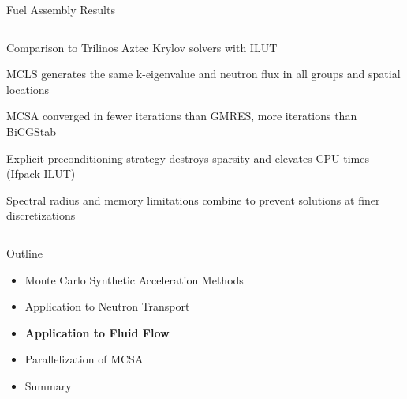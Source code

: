 \documentclass{beamer}
\begin{document}
\begin{frame}{Fuel Assembly Results}
\begin{columns}
    \begin{column}{0.5\textwidth}
      
      \begin{itemize}
        {\small
        \item Comparison to Trilinos Aztec Krylov solvers with ILUT
          \medskip
        \item MCLS generates the same k-eigenvalue and neutron flux in
          all groups and spatial locations
          \medskip
        \item MCSA converged in fewer iterations than GMRES, more
          iterations than BiCGStab
          \medskip
        \item Explicit preconditioning strategy destroys sparsity and
          elevates CPU times (Ifpack ILUT)
          \medskip
        \item Spectral radius and memory limitations combine to
          prevent solutions at finer discretizations
        }
      \end{itemize}

    \end{column}

  \end{columns}

\end{frame}

\begin{frame}{Outline}

  \begin{itemize}
  \item Monte Carlo Synthetic Acceleration Methods
    \bigskip
  \item Application to Neutron Transport
    \bigskip
  \item \textbf{Application to Fluid Flow}
    \bigskip
  \item Parallelization of MCSA
    \bigskip
  \item Summary
  \end{itemize}

\end{frame}
\end{document}
